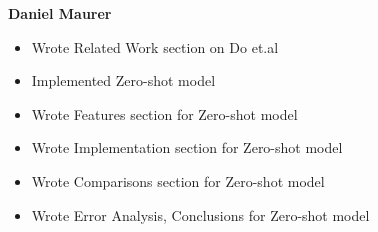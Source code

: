 \textbf{Daniel Maurer}
\begin{itemize}
    \item Wrote Related Work section on Do et.al
    \item Implemented Zero-shot model
    \item Wrote Features section for Zero-shot model
    \item Wrote Implementation section for Zero-shot model
    \item Wrote Comparisons section for Zero-shot model
    \item Wrote Error Analysis, Conclusions for Zero-shot model
\end{itemize}